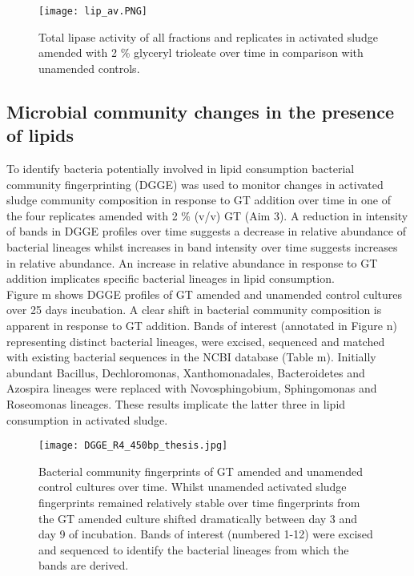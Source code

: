 \documentclass[twoside]{article}
\begin{document}
\begin{figure}
\texttt{[image: lip\_av.PNG]}
\caption{Total lipase activity of all fractions and replicates in activated sludge amended with 2 \% glyceryl trioleate over time in comparison with unamended controls.}
\end{figure}
\FloatBarrier

\subsection{Microbial community changes in the presence of lipids}
To identify bacteria potentially involved in lipid consumption bacterial community fingerprinting (DGGE) was used to monitor changes in activated sludge community composition in response to GT addition over time in one of the four replicates amended with 2 \% (v/v) GT (Aim 3). A reduction in intensity of bands in DGGE profiles over time suggests a decrease in relative abundance of bacterial lineages whilst increases in band intensity over time suggests increases in relative abundance. An increase in relative abundance in response to GT addition implicates specific bacterial lineages in lipid consumption.\\

Figure m shows DGGE profiles of GT amended and unamended control cultures over 25 days incubation. A clear shift in bacterial community composition is apparent in response to GT addition. Bands of interest (annotated in Figure n) representing distinct bacterial lineages, were excised, sequenced and matched with existing bacterial sequences in the NCBI database (Table m). Initially abundant Bacillus, Dechloromonas, Xanthomonadales, Bacteroidetes and Azospira lineages were replaced with Novosphingobium, Sphingomonas and Roseomonas lineages. These results implicate the latter three in lipid consumption in activated sludge.\\

\begin{figure}
\texttt{[image: DGGE\_R4\_450bp\_thesis.jpg]}
\caption{Bacterial community fingerprints of GT amended and unamended control cultures over time. Whilst unamended activated sludge fingerprints remained relatively stable over time fingerprints from the GT amended culture shifted dramatically between day 3 and day 9 of incubation. Bands of interest (numbered 1-12) were excised and sequenced to identify the bacterial lineages from which the bands are derived.}
\end{figure}
\end{document}
